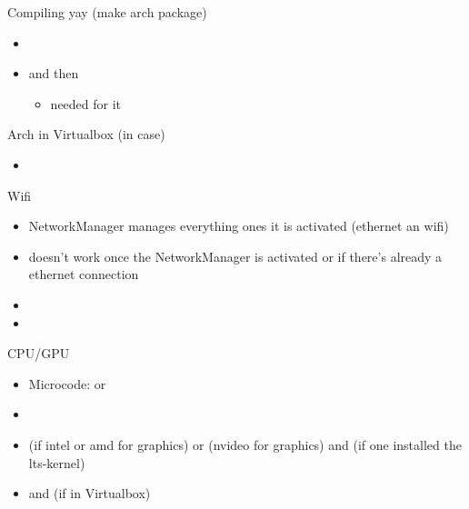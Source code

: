 \begin{frame}[fragile]{Compiling yay (make arch package)}
  \begin{itemize}
    \item {}
    \item {} and then 
      \begin{itemize}
        \item {} needed for it
      \end{itemize}
  \end{itemize}
\end{frame}

\begin{frame}[fragile]{Arch in Virtualbox (in case)}
  \begin{itemize}
    \item {}
  \end{itemize}
\end{frame}

\begin{frame}[fragile]{Wifi}
  \begin{itemize}
    \item NetworkManager manages everything ones it is activated (ethernet an wifi)
      \item {} doesn't work once the NetworkManager is activated or if there's already a ethernet connection
    \item {}
    \item {\tiny {}}
  \end{itemize}
\end{frame}

\begin{frame}[fragile]{CPU/GPU}
  \begin{itemize}
    \item \alert{Microcode:}  or 
    \item {}
    \item {} (if intel or amd for graphics) or  (nvideo for graphics) and  (if one installed the lts-kernel)
    \item {} and (if in Virtualbox)
  \end{itemize}
\end{frame}

